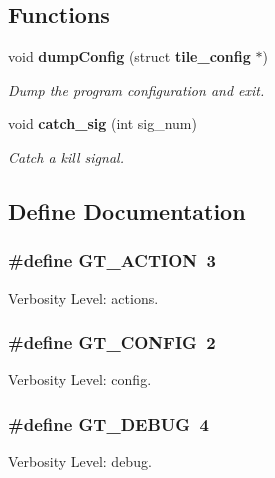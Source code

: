 \subsection*{Functions}
\begin{CompactItemize}
\item 
void {\bf dump\-Config} (struct {\bf tile\_\-config} $\ast$)
\begin{CompactList}\small\item\em Dump the program configuration and exit. \item\end{CompactList}\item 
void {\bf catch\_\-sig} (int sig\_\-num)
\begin{CompactList}\small\item\em Catch a kill signal. \item\end{CompactList}\end{CompactItemize}


\subsection{Define Documentation}
\subsubsection{\setlength{\rightskip}{0pt plus 5cm}\#define GT\_\-ACTION~3}\label{tile_8h_a3}


Verbosity Level: actions. 

\subsubsection{\setlength{\rightskip}{0pt plus 5cm}\#define GT\_\-CONFIG~2}\label{tile_8h_a2}


Verbosity Level: config. 

\subsubsection{\setlength{\rightskip}{0pt plus 5cm}\#define GT\_\-DEBUG~4}\label{tile_8h_a4}


Verbosity Level: debug. 

